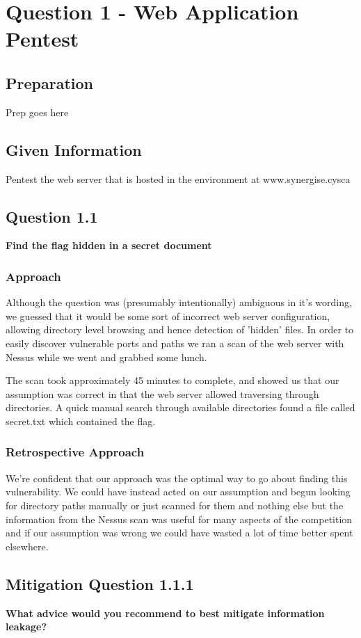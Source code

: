 \chapter{Question 1 - Web Application Pentest}

\section{Preparation}
Prep goes here

\section{Given Information}
Pentest the web server that is hosted in the environment at www.synergise.cysca

\section{Question 1.1}
\textbf{Find the flag hidden in a secret document}
\subsection{Approach}
Although the question was (presumably intentionally) ambiguous in it's wording,
we guessed that it would be some sort of incorrect web server configuration,
allowing directory level browsing and hence detection of 'hidden' files. In
order to easily discover vulnerable ports and paths we ran a scan of the web
server with Nessus while we went and grabbed some lunch.

The scan took approximately 45 minutes to complete, and showed us that our
assumption was correct in that the web server allowed traversing through
directories. A quick manual search through available directories found a file
called secret.txt which contained the flag.
\subsection{Retrospective Approach}
We're confident that our approach was the optimal way to go about finding this
vulnerability. We could have instead acted on our assumption and begun looking
for directory paths manually or just scanned for them and nothing else but the
information from the Nessus scan was useful for many aspects of the competition
and if our assumption was wrong we could have wasted a lot of time better spent
elsewhere.

\section{Mitigation Question 1.1.1}
\textbf{What advice would you recommend to best mitigate information leakage?}
